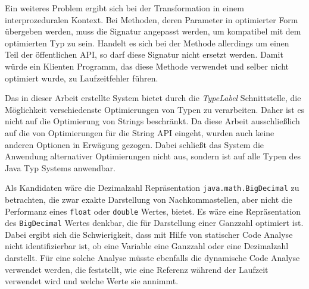 Ein weiteres Problem ergibt sich bei der Transformation in einem interprozeduralen Kontext. Bei Methoden, 
deren Parameter in optimierter Form übergeben werden, muss die Signatur angepasst werden, um
kompatibel mit dem optimierten Typ zu sein. Handelt es sich bei der Methode allerdings um einen
Teil der öffentlichen API, so darf diese Signatur nicht ersetzt werden. Damit würde ein Klienten Programm,
das diese Methode verwendet und selber nicht optimiert wurde, zu Laufzeitfehler führen.  

Das in dieser Arbeit erstellte System bietet durch die \textit{TypeLabel} Schnittstelle, die 
Möglichkeit verschiedenste Optimierungen von Typen zu verarbeiten. Daher ist
es nicht auf die Optimierung von Strings beschränkt. Da diese Arbeit 
ausschließlich auf die von Optimierungen für die String API eingeht, wurden
auch keine anderen Optionen in Erwägung gezogen. Dabei schließt das System die Anwendung 
alternativer Optimierungen nicht aus, sondern ist auf alle Typen des Java Typ Systems anwendbar. 

Als Kandidaten wäre die Dezimalzahl Repräsentation \texttt{java.math.BigDecimal} zu betrachten,
die zwar exakte Darstellung von Nachkommastellen, aber nicht die Performanz eines \texttt{float} oder
\texttt{double} Wertes, bietet. Es wäre eine Repräsentation des \texttt{BigDecimal} Wertes denkbar,
die für Darstellung einer Ganzzahl optimiert ist. Dabei ergibt sich die Schwierigkeit, dass mit Hilfe von
statischer Code Analyse nicht identifizierbar ist, ob eine Variable eine Ganzzahl oder eine
Dezimalzahl darstellt. Für eine solche Analyse müsste ebenfalls die dynamische Code Analyse verwendet werden, 
die feststellt, wie eine Referenz während der Laufzeit verwendet wird und welche Werte sie annimmt.

